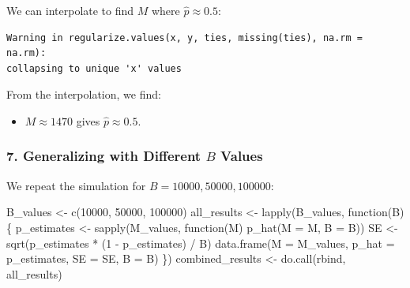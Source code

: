 \documentclass[
  letterpaper,
  DIV=11,
  numbers=noendperiod]{scrartcl}
\newenvironment{Shaded}{\begin{snugshade}}{\end{snugshade}}
\newcommand{\AttributeTok}[1]{\textcolor[rgb]{0.98,0.46,0.51}{#1}}
\newcommand{\ControlFlowTok}[1]{\textcolor[rgb]{0.98,0.46,0.51}{#1}}
\newcommand{\DecValTok}[1]{\textcolor[rgb]{0.47,0.72,1.00}{#1}}
\newcommand{\FloatTok}[1]{\textcolor[rgb]{0.47,0.72,1.00}{#1}}
\newcommand{\FunctionTok}[1]{\textcolor[rgb]{0.70,0.57,0.94}{#1}}
\newcommand{\NormalTok}[1]{\textcolor[rgb]{0.88,0.89,0.91}{#1}}
\newcommand{\OtherTok}[1]{\textcolor[rgb]{0.70,0.57,0.94}{#1}}
\newcommand{\SpecialCharTok}[1]{\textcolor[rgb]{0.47,0.72,1.00}{#1}}
\providecommand{\tightlist}{%
  \setlength{\itemsep}{0pt}\setlength{\parskip}{0pt}}\usepackage{longtable,booktabs,array}
\begin{document}
We can interpolate to find \(M\) where \(\hat{p} \approx 0.5\):

\begin{Shaded}
\end{Shaded}

\begin{verbatim}
Warning in regularize.values(x, y, ties, missing(ties), na.rm = na.rm):
collapsing to unique 'x' values
\end{verbatim}

From the interpolation, we find:

\begin{itemize}
\tightlist
\item
  \(M \approx 1470\) gives \(\hat{p} \approx 0.5\).
\end{itemize}

\subsubsection{\texorpdfstring{7. Generalizing with Different \(B\)
Values}{7. Generalizing with Different B Values}}\label{generalizing-with-different-b-values}

We repeat the simulation for \(B = 10000, 50000, 100000\):

\begin{Shaded}
\begin{Highlighting}[]
\NormalTok{B\_values }\OtherTok{\textless{}{-}} \FunctionTok{c}\NormalTok{(}\DecValTok{10000}\NormalTok{, }\DecValTok{50000}\NormalTok{, }\DecValTok{100000}\NormalTok{)}
\NormalTok{all\_results }\OtherTok{\textless{}{-}} \FunctionTok{lapply}\NormalTok{(B\_values, }\ControlFlowTok{function}\NormalTok{(B) \{}
\NormalTok{  p\_estimates }\OtherTok{\textless{}{-}} \FunctionTok{sapply}\NormalTok{(M\_values, }\ControlFlowTok{function}\NormalTok{(M) }\FunctionTok{p\_hat}\NormalTok{(}\AttributeTok{M =}\NormalTok{ M, }\AttributeTok{B =}\NormalTok{ B))}
\NormalTok{  SE }\OtherTok{\textless{}{-}} \FunctionTok{sqrt}\NormalTok{(p\_estimates }\SpecialCharTok{*}\NormalTok{ (}\DecValTok{1} \SpecialCharTok{{-}}\NormalTok{ p\_estimates) }\SpecialCharTok{/}\NormalTok{ B)}
  \FunctionTok{data.frame}\NormalTok{(}\AttributeTok{M =}\NormalTok{ M\_values, }\AttributeTok{p\_hat =}\NormalTok{ p\_estimates, }\AttributeTok{SE =}\NormalTok{ SE, }\AttributeTok{B =}\NormalTok{ B)}
\NormalTok{\})}
\NormalTok{combined\_results }\OtherTok{\textless{}{-}} \FunctionTok{do.call}\NormalTok{(rbind, all\_results)}
\end{Highlighting}
\end{Shaded}
\end{document}
